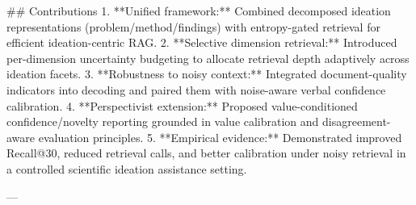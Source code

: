 ## Contributions  
1. **Unified framework:** Combined decomposed ideation representations (problem/method/findings) with entropy-gated retrieval for efficient ideation-centric RAG.  
2. **Selective dimension retrieval:** Introduced per-dimension uncertainty budgeting to allocate retrieval depth adaptively across ideation facets.  
3. **Robustness to noisy context:** Integrated document-quality indicators into decoding and paired them with noise-aware verbal confidence calibration.  
4. **Perspectivist extension:** Proposed value-conditioned confidence/novelty reporting grounded in value calibration and disagreement-aware evaluation principles.  
5. **Empirical evidence:** Demonstrated improved Recall@30, reduced retrieval calls, and better calibration under noisy retrieval in a controlled scientific ideation assistance setting.

---